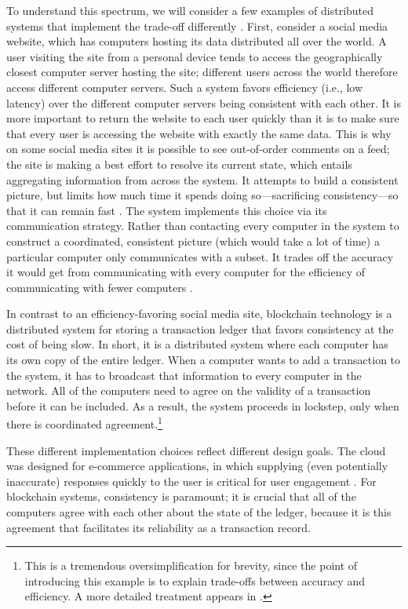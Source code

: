 \documentclass[sigplan,screen]{acmart}
\begin{document}
To understand this spectrum, we will consider a few examples of distributed systems that implement the trade-off differently \cite{DeCandia2007dynamo, Herlihy1990apologizing}. First, consider a social media website, which has computers hosting its data distributed all over the world. A user visiting the site from a personal device tends to access the geographically closest computer server hosting the site; different users across the world therefore access different computer servers. Such a system favors efficiency (i.e., low latency) over the different computer servers being consistent with each other. It is more important to return the website to each user quickly than it is to make sure that every user is accessing the website with exactly the same data. This is why on some social media sites it is possible to see out-of-order comments on a feed; the site is making a best effort to resolve its current state, which entails aggregating information from across the system. It attempts to build a consistent picture, but limits how much time it spends doing so---sacrificing consistency---so that it can remain fast  \cite{DeCandia2007dynamo, Lu2015Existential, Vogels2009eventualconsistency}. The system implements this choice via its communication strategy. Rather than contacting every computer in the system to construct a coordinated, consistent picture (which would take a lot of time) a particular computer only communicates with a subset. It trades off the accuracy it would get from communicating with every computer for the efficiency of communicating with fewer computers \cite{krishnamurthy2002tunable, hellerstein2019calm}.

In contrast to an efficiency-favoring social media site, blockchain technology is a distributed system for storing a transaction ledger that favors consistency at the cost of being slow\cite{nakamoto2012bitcoin}. In short, it is a distributed system where each computer has its own copy of the entire ledger. When a computer wants to add a transaction to the system, it has to broadcast that information to every computer in the network. All of the computers need to agree on the validity of a transaction before it can be included. As a result, the system proceeds in lockstep, only when there is coordinated agreement.\footnote{This is a tremendous oversimplification for brevity, since the point of introducing this example is to explain trade-offs between accuracy and efficiency. A more detailed treatment appears in \citet{narayanan2016bitcoin}.}

These different implementation choices reflect different design goals. The cloud was designed for e-commerce applications, in which supplying (even potentially inaccurate) responses quickly to the user is critical for user engagement \cite{bailis2012pbs, brutlag2009speedmatters}. For blockchain systems, consistency is paramount; it is crucial that all of the computers agree with each other about the state of the ledger, because it is this agreement that facilitates its reliability as a transaction record.
\end{document}
